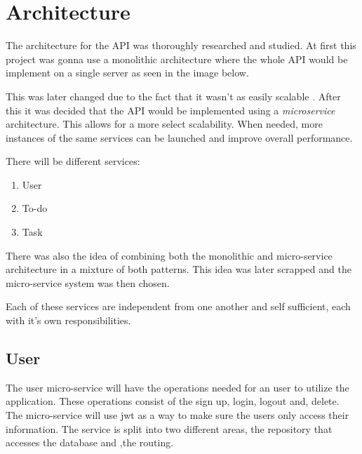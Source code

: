 \chapter{Architecture}

	
	The architecture for the API was thoroughly researched and studied. At first this project was gonna use a monolithic architecture \cite{monolith} where the whole API would be implement on a single server as seen in the image below.
	
	This was later changed due to the fact that it wasn't as easily scalable \cite{scale}. After this it was decided that the API would be implemented using a \textit{microservice}\cite{microservice} architecture. This allows for a more select scalability. When needed, more instances of the same services can be launched and improve overall performance.
	
	There will be different services:
	\begin{enumerate}
		\item User
		\item To-do
		\item Task
	\end{enumerate}

	
	There was also the idea of combining both the monolithic and micro-service architecture in a mixture of both patterns. This idea was later scrapped and the micro-service system was then chosen.
	
	
	Each of these services are independent from one another and self sufficient, each with it's own responsibilities. 
	
	
	
	\section{User}
	The user micro-service will have the operations needed for an user to utilize the application. These operations consist of the sign up, login, logout and, delete.
	The micro-service will use \gls{jwt} \cite{jwt} as a way to make sure the users only access their information.
	The service is split into two different areas, the repository\cite{repositorypattern} that accesses the database and ,the routing.
	
